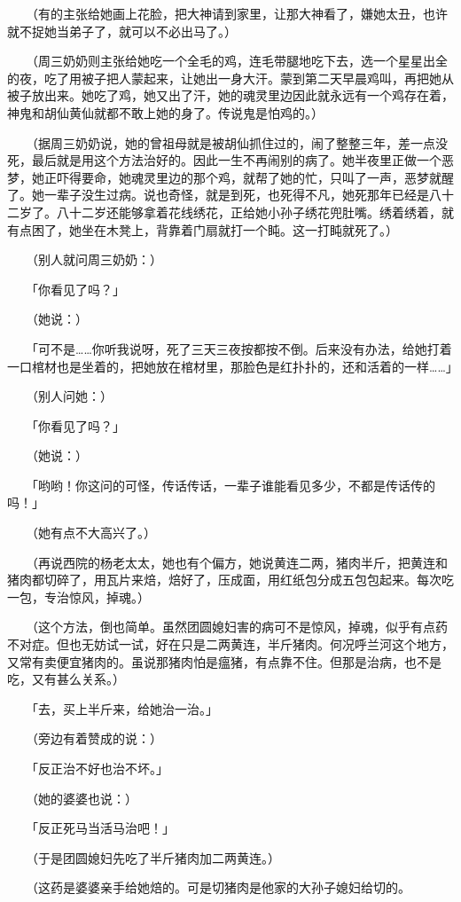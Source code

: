 \documentclass[UTF8]{ctexart}
\begin{document}
　　（有的主张给她画上花脸，把大神请到家里，让那大神看了，嫌她太丑，也许就不捉她当弟子了，就可以不必出马了。）

　　（周三奶奶则主张给她吃一个全毛的鸡，连毛带腿地吃下去，选一个星星出全的夜，吃了用被子把人蒙起来，让她出一身大汗。蒙到第二天早晨鸡叫，再把她从被子放出来。她吃了鸡，她又出了汗，她的魂灵里边因此就永远有一个鸡存在着，神鬼和胡仙黄仙就都不敢上她的身了。传说鬼是怕鸡的。）

　　（据周三奶奶说，她的曾祖母就是被胡仙抓住过的，闹了整整三年，差一点没死，最后就是用这个方法治好的。因此一生不再闹别的病了。她半夜里正做一个恶梦，她正吓得要命，她魂灵里边的那个鸡，就帮了她的忙，只叫了一声，恶梦就醒了。她一辈子没生过病。说也奇怪，就是到死，也死得不凡，她死那年已经是八十二岁了。八十二岁还能够拿着花线绣花，正给她小孙子绣花兜肚嘴。绣着绣着，就有点困了，她坐在木凳上，背靠着门扇就打一个盹。这一打盹就死了。）

　　（别人就问周三奶奶：）

　　「你看见了吗？」

　　（她说：）

　　「可不是……你听我说呀，死了三天三夜按都按不倒。后来没有办法，给她打着一口棺材也是坐着的，把她放在棺材里，那脸色是红扑扑的，还和活着的一样……」

　　（别人问她：）

　　「你看见了吗？」

　　（她说：）

　　「哟哟！你这问的可怪，传话传话，一辈子谁能看见多少，不都是传话传的吗！」

　　（她有点不大高兴了。）

　　（再说西院的杨老太太，她也有个偏方，她说黄连二两，猪肉半斤，把黄连和猪肉都切碎了，用瓦片来焙，焙好了，压成面，用红纸包分成五包包起来。每次吃一包，专治惊风，掉魂。）

　　（这个方法，倒也简单。虽然团圆媳妇害的病可不是惊风，掉魂，似乎有点药不对症。但也无妨试一试，好在只是二两黄连，半斤猪肉。何况呼兰河这个地方，又常有卖便宜猪肉的。虽说那猪肉怕是瘟猪，有点靠不住。但那是治病，也不是吃，又有甚么关系。）

　　「去，买上半斤来，给她治一治。」

　　（旁边有着赞成的说：）

　　「反正治不好也治不坏。」

　　（她的婆婆也说：）

　　「反正死马当活马治吧！」

　　（于是团圆媳妇先吃了半斤猪肉加二两黄连。）

　　（这药是婆婆亲手给她焙的。可是切猪肉是他家的大孙子媳妇给切的。
\end{document}
